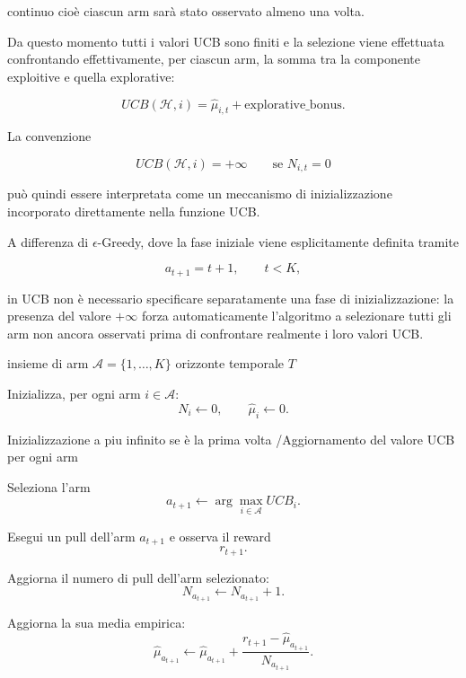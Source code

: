 \begin{observation}{continuo}
cioè ciascun arm sarà stato osservato almeno una volta.

Da questo momento tutti i valori UCB sono finiti e la selezione viene effettuata confrontando effettivamente, per ciascun arm, la somma tra la componente exploitive e quella explorative:

\[
UCB(\mathcal H,i)
=
\widehat{\mu}_{i,t}
+
\mathrm{explorative\_bonus}.
\]

La convenzione

\[
UCB(\mathcal H,i)=+\infty
\qquad
\text{se }N_{i,t}=0
\]

può quindi essere interpretata come un meccanismo di inizializzazione incorporato direttamente nella funzione UCB.

A differenza di $\epsilon$-Greedy, dove la fase iniziale viene esplicitamente definita tramite

\[
a_{t+1}=t+1,
\qquad
t<K,
\]

in UCB non è necessario specificare separatamente una fase di inizializzazione: la presenza del valore $+\infty$ forza automaticamente l'algoritmo a selezionare tutti gli arm non ancora osservati prima di confrontare realmente i loro valori UCB.
\end{observation}

\begin{algorithmic}[1]

\Require insieme di arm $\mathcal A=\{1,\ldots,K\}$
\Require orizzonte temporale $T$

\State Inizializza, per ogni arm $i\in\mathcal A$:
\[
N_i \gets 0,
\qquad
\widehat{\mu}_i \gets 0.
\]


    \State Inizializzazione a piu infinito se è la prima volta /Aggiornamento del valore UCB per ogni arm

    \State Seleziona l'arm
    \[
    a_{t+1}
    \gets
    \arg\max_{i\in\mathcal A} UCB_i.
    \]

    \State Esegui un pull dell'arm $a_{t+1}$ e osserva il reward
    \[
    r_{t+1}.
    \]

    \State Aggiorna il numero di pull dell'arm selezionato:
    \[
    N_{a_{t+1}}
    \gets
    N_{a_{t+1}}+1.
    \]

    \State Aggiorna la sua media empirica:
    \[
    \widehat{\mu}_{a_{t+1}}
    \gets
    \widehat{\mu}_{a_{t+1}}
    +
    \frac{
    r_{t+1}
    -
    \widehat{\mu}_{a_{t+1}}
    }{
    N_{a_{t+1}}
    }.
    \]

\EndFor

\end{algorithmic}


